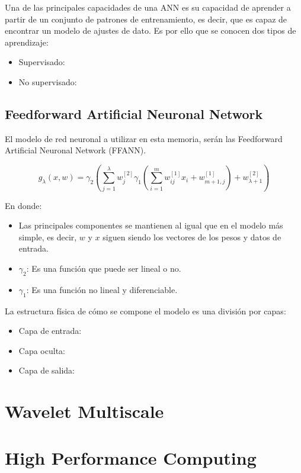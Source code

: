 Una de las principales capacidades de una ANN es su capacidad de aprender a partir de un conjunto de patrones de entrenamiento, es decir, que es capaz
de encontrar un modelo de ajustes de dato. Es por ello que se conocen dos tipos de aprendizaje:
\begin{itemize}
	\item Supervisado:
	\item No supervisado:
\end{itemize}

\subsection{Feedforward Artificial Neuronal Network}

El modelo de red neuronal a utilizar en esta memoria, serán las Feedforward Artificial Neuronal Network (FFANN).

$$ g_{\lambda}(x,w) = \gamma_2 \left( \sum_{j = 1}^{\lambda} w_j^{[2]} \gamma_1 \left( \sum_{i = 1}^{m} w_{ij}^{[1]}x_i + w_{m+1,j}^{[1]} \right) + w_{\lambda+1}^{[2]} \right) $$

En donde:
\begin{itemize}
	\item Las principales componentes se mantienen al igual que en el modelo más simple, es decir, $w$ y $x$ siguen siendo los vectores de los pesos y datos de entrada.
	\item $\gamma_2$: Es una función que puede ser lineal o no.
	\item $\gamma_1$: Es una función no lineal y diferenciable.
\end{itemize}

La estructura física de cómo se compone el modelo es una división por capas:
\begin{itemize}
	\item Capa de entrada:
	\item Capa oculta:
	\item Capa de salida:
\end{itemize}

\section{Wavelet Multiscale}

\section{High Performance Computing}
